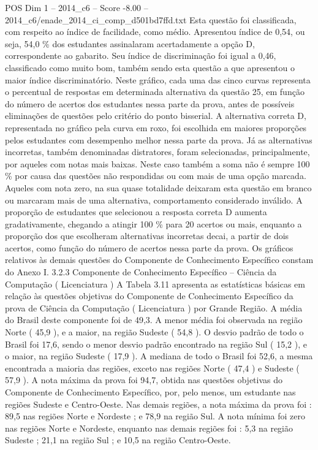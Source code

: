 \begin{textsample}{POS Dim 1 – 2014\_c6 – Score -8.00 – 2014\_c6/enade\_2014\_ci\_comp\_d501bd7ffd.txt}
Esta questão foi classificada, com respeito ao índice de facilidade, como médio.
Apresentou índice de 0,54, ou seja, 54,0 \% dos estudantes assinalaram acertadamente a opção D, correspondente ao gabarito.
Seu índice de discriminação foi igual a 0,46, classificado como muito bom, também sendo esta questão a que apresentou o maior índice discriminatório.
Neste gráfico, cada uma das cinco curvas representa o percentual de respostas em determinada alternativa da questão 25, em função do número de acertos dos estudantes nessa parte da prova, antes de possíveis eliminações de questões pelo critério do ponto bisserial.
A alternativa correta D, representada no gráfico pela curva em roxo, foi escolhida em maiores proporções pelos estudantes com desempenho melhor nessa parte da prova.
Já as alternativas incorretas, também denominadas distratores, foram selecionadas, principalmente, por aqueles com notas mais baixas.
Neste caso também a soma não é sempre 100 \% por causa das questões não respondidas ou com mais de uma opção marcada.
Aqueles com nota zero, na sua quase totalidade deixaram esta questão em branco ou marcaram mais de uma alternativa, comportamento considerado inválido.
A proporção de estudantes que selecionou a resposta correta D aumenta gradativamente, chegando a atingir 100 \% para 20 acertos ou mais, enquanto a proporção dos que escolheram alternativas incorretas decai, a partir de dois acertos, como função do número de acertos nessa parte da prova.
Os gráficos relativos às demais questões do Componente de Conhecimento Específico constam do Anexo I. 3.2.3 Componente de Conhecimento Específico – Ciência da Computação ( Licenciatura ) A Tabela 3.11 apresenta as estatísticas básicas em relação às questões objetivas do Componente de Conhecimento Específico da prova de Ciência da Computação ( Licenciatura ) por Grande Região.
A média do Brasil deste componente foi de 49,3.
A menor média foi observada na região Norte ( 45,9 ), e a maior, na região Sudeste ( 54,8 ).
O desvio padrão de todo o Brasil foi 17,6, sendo o menor desvio padrão encontrado na região Sul ( 15,2 ), e o maior, na região Sudeste ( 17,9 ).
A mediana de todo o Brasil foi 52,6, a mesma encontrada a maioria das regiões, exceto nas regiões Norte ( 47,4 ) e Sudeste ( 57,9 ).
A nota máxima da prova foi 94,7, obtida nas questões objetivas do Componente de Conhecimento Específico, por, pelo menos, um estudante nas regiões Sudeste e Centro-Oeste.
Nas demais regiões, a nota máxima da prova foi : 89,5 nas regiões Norte e Nordeste ; e 78,9 na região Sul.
A nota mínima foi zero nas regiões Norte e Nordeste, enquanto nas demais regiões foi : 5,3 na região Sudeste ; 21,1 na região Sul ; e 10,5 na região Centro-Oeste.

\end{textsample}
